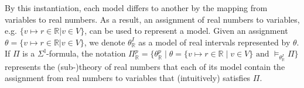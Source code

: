 By this instantiation, each model differs to another by the mapping from variables to real numbers. As a result, an assignment of real numbers to variables, e.g. $\{v \mapsto r \in \mathbb{R} | v \in V\}$, can be used to represent a model. Given an assignment $\theta = \{v \mapsto r \in \mathbb{R} | v \in V\}$, we denote $\theta^I_\mathbb{R}$ as a model of real intervals represented by $\theta$. If $\Pi$ is a $\Sigma^\mathbb{I}$-formula, the notation ${\Pi^p_\mathbb{R} = \{\theta^p_\mathbb{R} \mid \theta = \{v \mapsto r \in \mathbb{R} \mid v \in V\} \text{ and } \models_{\theta^I_\mathbb{R}} \Pi \}}$ represents the (sub-)theory of real numbers that each of its model contain the assignment from real numbers to variables that (intuitively) satisfies $\Pi$.



